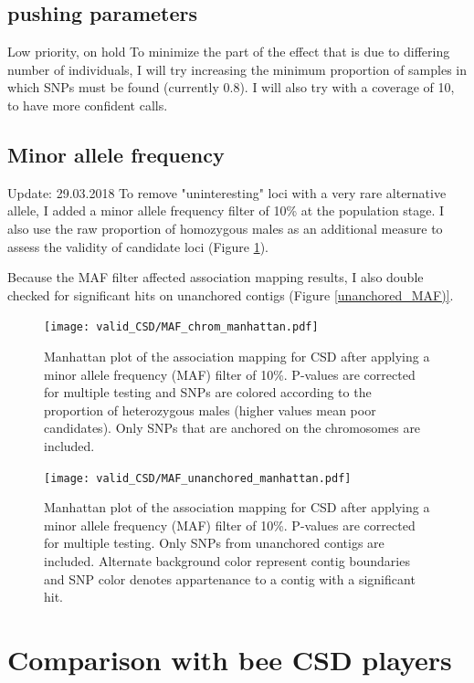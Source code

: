 \documentclass[10pt,a4paper]{report}
\begin{document}
\section{pushing parameters}
Low priority, on hold
To minimize the part of the effect that is due to differing number of individuals, I will try increasing the minimum proportion of samples in which SNPs must be found (currently 0.8). I will also try with a coverage of 10, to have more confident calls.

\section{Minor allele frequency}
Update: 29.03.2018
To remove "uninteresting" loci with a very rare alternative allele, I added a minor allele frequency filter of 10\% at the population stage. I also use the raw proportion of homozygous males as an additional measure to assess the validity of candidate loci (Figure \ref{manhattan_MAF}).

Because the MAF filter affected association mapping results, I also double checked for significant hits on unanchored contigs (Figure \ref{unanchored_MAF)}.

\begin{figure}
\texttt{[image: valid\_CSD/MAF\_chrom\_manhattan.pdf]}
\caption{Manhattan plot of the association mapping for CSD after applying a minor allele frequency (MAF) filter of 10\%. P-values are corrected for multiple testing and SNPs are colored according to the proportion of heterozygous males (higher values mean poor candidates). Only SNPs that are anchored on the chromosomes are included.}
\label{manhattan_MAF}
\end{figure}

\begin{figure}
\texttt{[image: valid\_CSD/MAF\_unanchored\_manhattan.pdf]}
\caption{Manhattan plot of the association mapping for CSD after applying a minor allele frequency (MAF) filter of 10\%. P-values are corrected for multiple testing. Only SNPs from unanchored contigs are included. Alternate background color represent contig boundaries and SNP color denotes appartenance to a contig with a significant hit. }
\label{unanchored_MAF}
\end{figure}

\chapter{Comparison with bee CSD players}
\end{document}
